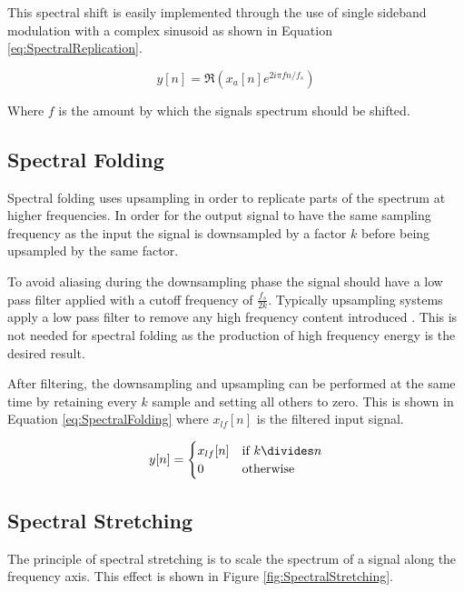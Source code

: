 		This spectral shift is easily implemented through the use of single sideband modulation with a complex
		sinusoid as shown in Equation \ref{eq:SpectralReplication}.

		\begin{equation}
			y[n] = \Re \left( x_{a}[n] e^{2i\pi fn/ f_{s}} \right)
			\label{eq:SpectralReplication}
		\end{equation}

		Where $f$ is the amount by which the signals spectrum should be shifted.

	\subsection{Spectral Folding}
	\label{sec:Excitation-Methods-SpectralFolding}
		Spectral folding uses upsampling in order to replicate parts of the spectrum at higher frequencies. In
		order for the output signal to have the same sampling frequency as the input the signal is 
		downsampled by a factor $k$ before being upsampled by the same factor. 
		
		To avoid aliasing during the downsampling phase the signal should have a low pass filter applied
		with a cutoff frequency of $\frac{f_{s}}{2k}$. Typically upsampling systems apply a low pass filter
		to remove any high frequency content introduced \citep{oppenheim2014discrete}. This is not needed for
		spectral folding as the production of high frequency energy is the desired result.

		After filtering, the downsampling and upsampling can be performed at the same time by retaining
		every $k$ sample and setting all others to zero. This is shown in Equation
		\ref{eq:SpectralFolding} where $x_{lf}[n]$ is the filtered input signal.		

		\begin{equation}
			y[n] = \begin{cases}
				x_{lf}[n] & \text{if $k \divides n$} \\
				0 & \text{otherwise}
			\end{cases}
			\label{eq:SpectralFolding}
		\end{equation}

	\subsection{Spectral Stretching}
	\label{sec:Excitation-Methods-SpectralStretching}
		The principle of spectral stretching is to scale the spectrum of a signal along the frequency axis. This
		effect is shown in Figure \ref{fig:SpectralStretching}.


